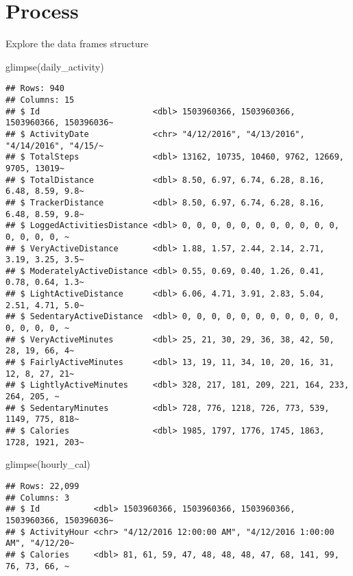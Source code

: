 \documentclass[
]{article}
\newenvironment{Shaded}{\begin{snugshade}}{\end{snugshade}}
\newcommand{\FunctionTok}[1]{\textcolor[rgb]{0.00,0.00,0.00}{#1}}
\newcommand{\NormalTok}[1]{#1}
\begin{document}
\hypertarget{process}{%
\section{Process}\label{process}}

Explore the data frames structure

\begin{Shaded}
\begin{Highlighting}[]
\FunctionTok{glimpse}\NormalTok{(daily\_activity)}
\end{Highlighting}
\end{Shaded}

\begin{verbatim}
## Rows: 940
## Columns: 15
## $ Id                       <dbl> 1503960366, 1503960366, 1503960366, 150396036~
## $ ActivityDate             <chr> "4/12/2016", "4/13/2016", "4/14/2016", "4/15/~
## $ TotalSteps               <dbl> 13162, 10735, 10460, 9762, 12669, 9705, 13019~
## $ TotalDistance            <dbl> 8.50, 6.97, 6.74, 6.28, 8.16, 6.48, 8.59, 9.8~
## $ TrackerDistance          <dbl> 8.50, 6.97, 6.74, 6.28, 8.16, 6.48, 8.59, 9.8~
## $ LoggedActivitiesDistance <dbl> 0, 0, 0, 0, 0, 0, 0, 0, 0, 0, 0, 0, 0, 0, 0, ~
## $ VeryActiveDistance       <dbl> 1.88, 1.57, 2.44, 2.14, 2.71, 3.19, 3.25, 3.5~
## $ ModeratelyActiveDistance <dbl> 0.55, 0.69, 0.40, 1.26, 0.41, 0.78, 0.64, 1.3~
## $ LightActiveDistance      <dbl> 6.06, 4.71, 3.91, 2.83, 5.04, 2.51, 4.71, 5.0~
## $ SedentaryActiveDistance  <dbl> 0, 0, 0, 0, 0, 0, 0, 0, 0, 0, 0, 0, 0, 0, 0, ~
## $ VeryActiveMinutes        <dbl> 25, 21, 30, 29, 36, 38, 42, 50, 28, 19, 66, 4~
## $ FairlyActiveMinutes      <dbl> 13, 19, 11, 34, 10, 20, 16, 31, 12, 8, 27, 21~
## $ LightlyActiveMinutes     <dbl> 328, 217, 181, 209, 221, 164, 233, 264, 205, ~
## $ SedentaryMinutes         <dbl> 728, 776, 1218, 726, 773, 539, 1149, 775, 818~
## $ Calories                 <dbl> 1985, 1797, 1776, 1745, 1863, 1728, 1921, 203~
\end{verbatim}

\begin{Shaded}
\begin{Highlighting}[]
\FunctionTok{glimpse}\NormalTok{(hourly\_cal)}
\end{Highlighting}
\end{Shaded}

\begin{verbatim}
## Rows: 22,099
## Columns: 3
## $ Id           <dbl> 1503960366, 1503960366, 1503960366, 1503960366, 150396036~
## $ ActivityHour <chr> "4/12/2016 12:00:00 AM", "4/12/2016 1:00:00 AM", "4/12/20~
## $ Calories     <dbl> 81, 61, 59, 47, 48, 48, 48, 47, 68, 141, 99, 76, 73, 66, ~
\end{verbatim}
\end{document}
